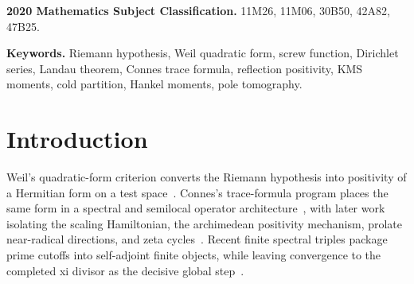 \documentclass[11pt]{article}
\begin{document}
\begin{abstract}
off-line zero.  Every such zero $\rho=\beta+i\gamma$ satisfies
\[
 4\le C(\gamma^2+1),\qquad \gamma^2>\frac{7907}{93}.
\]
Consequently, if
\[
 0\le R,\qquad C\bigl((R+\tfrac12)^2+1\bigr)<4,
\]
then the continued completed prime--Gamma response is anti-Herglotz throughout the central
frequency band $|\Re z|\le R$.  The rational certificate $C<93/2000$ makes
$R=218/25$ admissible.  The response sign only
at positive frequencies $\Re z>R$, vanishing of $\mathcal E_\perp$, equality
$M_2=\mathcal Q_W$, convergence of the finite KMS systems to $\mathcal Q_W$, the Connes
reflection-positive realization, and RH are equivalent.  Thus the quartet budget, source
abscissa, projective radius, thermal gap, and ultraviolet response are successive clauses of one
master theorem rather than separate headline results.
More generally, any verified critical-line prefix through height $H$ transfers passivity to every
centered band $|\Re z|\le R$ with $R+\frac12\le H$; the remaining positive-frequency tail is then
equivalent to the same monotone Bernstein order parameter and to RH.
Full response convergence is unnecessary.  A universal countable family of one-state,
zero-Hamiltonian KMS systems with rational observable amplitudes has imaginary response cluster
set exactly $(-\infty,0]$ at every upper-half-plane point.  Hence it is enough to require the
continued arithmetic response to belong to this passive chamber only at Gaussian-rational points
above height $218/25$.  That countable membership condition is equivalent to RH; the palette
therefore isolates the remaining arithmetic burden as source membership in the passive chamber,
not construction of the chamber itself.
The paper makes strict unconditional progress toward the endpoint but does not prove RH.
\end{abstract}

\noindent\textbf{2020 Mathematics Subject Classification.}
11M26, 11M06, 30B50, 42A82, 47B25.

\noindent\textbf{Keywords.}
Riemann hypothesis, Weil quadratic form, screw function, Dirichlet series, Landau theorem,
Connes trace formula, reflection positivity, KMS moments, cold partition, Hankel moments,
pole tomography.

\section{Introduction}

Weil's quadratic-form criterion converts the Riemann hypothesis into positivity of a Hermitian
form on a test space~\cite{Weil1952,Yoshida1992,Bombieri2000}.  Connes's trace-formula program
places the same form in a spectral and semilocal operator architecture~\cite{Connes1999}, with
later work isolating the scaling Hamiltonian, the archimedean positivity mechanism, prolate
near-radical directions, and zeta cycles~\cite{ConnesConsani2019,ConnesConsani2021,
ConnesConsani2023}.  Recent finite spectral triples package prime cutoffs into self-adjoint
finite objects, while leaving convergence to the completed xi divisor as the decisive global
step~\cite{ConnesConsaniMoscovici2025}.
\end{document}

